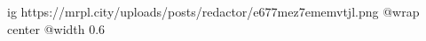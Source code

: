  
 
 
 
 

\ifcmt
  ig https://mrpl.city/uploads/posts/redactor/e677mez7ememvtjl.png
  @wrap center
  @width 0.6
\fi
